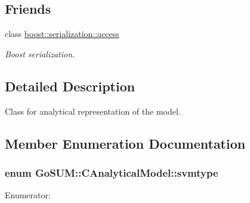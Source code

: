 \subsection*{Friends}
\begin{DoxyCompactItemize}
\item 
class \hyperlink{class_go_s_u_m_1_1_c_analytical_model_ac98d07dd8f7b70e16ccb9a01abf56b9c}{boost\-::serialization\-::access}
\begin{DoxyCompactList}\small\item\em Boost serialization. \end{DoxyCompactList}\end{DoxyCompactItemize}


\subsection{Detailed Description}
Class for analytical representation of the model. 

\subsection{Member Enumeration Documentation}
\hypertarget{class_go_s_u_m_1_1_c_analytical_model_ad8bee3341d00a0c75e89c1a4376d6fbb}{
\subsubsection[{svmtype}]{\setlength{\rightskip}{0pt plus 5cm}enum {\bf Go\-S\-U\-M\-::\-C\-Analytical\-Model\-::svmtype}}}\label{class_go_s_u_m_1_1_c_analytical_model_ad8bee3341d00a0c75e89c1a4376d6fbb}
\begin{Desc}
\item[Enumerator\-: ]\par
\begin{description}
\item[{\em 
\hypertarget{class_go_s_u_m_1_1_c_analytical_model_ad8bee3341d00a0c75e89c1a4376d6fbba57a67aad789d0e6d497f44cc2af4dcbe}{epsilonsvr}\label{class_go_s_u_m_1_1_c_analytical_model_ad8bee3341d00a0c75e89c1a4376d6fbba57a67aad789d0e6d497f44cc2af4dcbe}
}]\item[{\em 
\hypertarget{class_go_s_u_m_1_1_c_analytical_model_ad8bee3341d00a0c75e89c1a4376d6fbba5df7898d8ae62d31d25057570e7e15a8}{nusvr}\label{class_go_s_u_m_1_1_c_analytical_model_ad8bee3341d00a0c75e89c1a4376d6fbba5df7898d8ae62d31d25057570e7e15a8}
}]\end{description}
\end{Desc}



